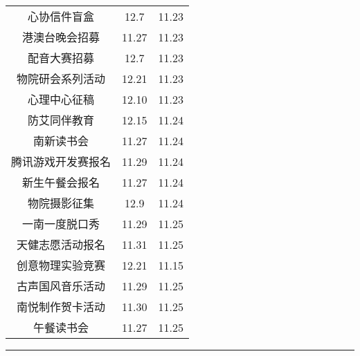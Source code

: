\documentclass[letterpaper, 12pt]{article}
\begin{document}
\begin{multicols}{2}
{\begin{longtable}{|c|c|c|}
    心协信件盲盒 & 12.7 & 11.23\\
    港澳台晚会招募 & 11.27 & 11.23\\
    配音大赛招募 & 12.7 & 11.23\\
    物院研会系列活动 & 12.21 & 11.23\\
    心理中心征稿 & 12.10 & 11.23\\
    防艾同伴教育 & 12.15 & 11.24\\
    南新读书会 & 11.27 & 11.24\\
    腾讯游戏开发赛报名 & 11.29 & 11.24\\
    新生午餐会报名 & 11.27 & 11.24\\
    物院摄影征集 & 12.9 & 11.24\\
    一南一度脱口秀 & 11.29 & 11.25\\
    天健志愿活动报名 & 11.31 & 11.25\\
    创意物理实验竞赛 & 12.21 & 11.15\\
    古声国风音乐活动 & 11.29 & 11.25\\
    南悦制作贺卡活动 & 11.30 & 11.25\\
    午餐读书会 & 11.27 & 11.25\\
    \hline
\end{longtable}
\unskip
\unpenalty
\unpenalty}\unvbox\colbbox
\end{multicols}
\hrule
\pagebreak
\end{document}

